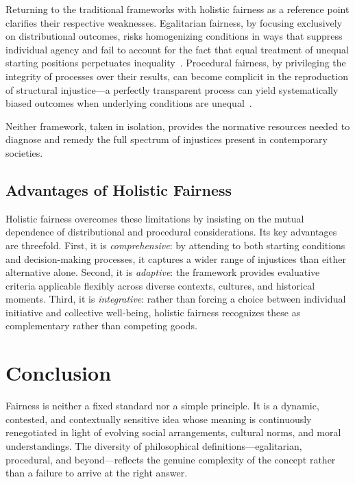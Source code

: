 \documentclass[11pt]{../shared/essay/essay}
\begin{document}
Returning to the traditional frameworks with holistic fairness as a reference point clarifies
their respective weaknesses. Egalitarian fairness, by focusing exclusively on distributional
outcomes, risks homogenizing conditions in ways that suppress individual agency and fail to
account for the fact that equal treatment of unequal starting positions perpetuates
inequality~\cite{temkin2019}. Procedural fairness, by privileging the integrity of processes
over their results, can become complicit in the reproduction of structural injustice---a
perfectly transparent process can yield systematically biased outcomes when underlying
conditions are unequal~\cite{macdonald1980,galligan1997}.

Neither framework, taken in isolation, provides the normative resources needed to diagnose
and remedy the full spectrum of injustices present in contemporary societies.

\subsection{Advantages of Holistic Fairness}

Holistic fairness overcomes these limitations by insisting on the mutual dependence of
distributional and procedural considerations. Its key advantages are threefold. First, it is
\textit{comprehensive}: by attending to both starting conditions and decision-making
processes, it captures a wider range of injustices than either alternative alone. Second, it is
\textit{adaptive}: the framework provides evaluative criteria applicable flexibly across diverse
contexts, cultures, and historical moments. Third, it is \textit{integrative}: rather than
forcing a choice between individual initiative and collective well-being, holistic fairness
recognizes these as complementary rather than competing goods.

\section{Conclusion}

Fairness is neither a fixed standard nor a simple principle. It is a dynamic, contested, and
contextually sensitive idea whose meaning is continuously renegotiated in light of evolving
social arrangements, cultural norms, and moral understandings. The diversity of philosophical
definitions---egalitarian, procedural, and beyond---reflects the genuine complexity of the
concept rather than a failure to arrive at the right answer.
\end{document}

